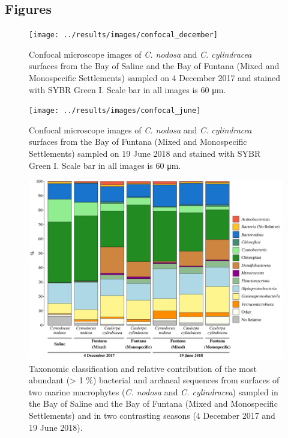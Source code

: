 \documentclass[12pt,]{article}
\begin{document}
\newpage

\hypertarget{figures}{%
\subsection{Figures}\label{figures}}

\begin{figure}[ht]

{\centering \texttt{[image: ../results/images/confocal\_december]} 

}

\caption{Confocal microscope images of \textit{C. nodosa} and \textit{C. cylindracea} surfaces from the Bay of Saline and the Bay of Funtana (Mixed and Monospecific Settlements) sampled on 4 December 2017 and stained with SYBR Green I. Scale bar in all images is 60 \si{\um}.\label{confocal_december}}\label{fig:unnamed-chunk-1}
\end{figure}

\newpage
\begin{figure}[ht]

{\centering \texttt{[image: ../results/images/confocal\_june]} 

}

\caption{Confocal microscope images of \textit{C. nodosa} and \textit{C. cylindracea} surfaces from the Bay of Funtana (Mixed and Monospecific Settlements) sampled on 19 June 2018 and stained with SYBR Green I. Scale bar in all images is 60 \si{\um}.\label{confocal_june}}\label{fig:unnamed-chunk-2}
\end{figure}

\newpage
\begin{figure}[ht]

{\centering \includegraphics[width=1\linewidth]{../results/figures/community_bar_plot} 

}

\caption{Taxonomic classification and relative contribution of the most abundant (> 1 \si{\percent}) bacterial and archaeal sequences from surfaces of two marine macrophytes (\textit{C. nodosa} and \textit{C. cylindracea}) sampled in the Bay of Saline and the Bay of Funtana (Mixed and Monospecific Settlements) and in two contrasting seasons (4 December 2017 and 19 June 2018).\label{community}}\label{fig:unnamed-chunk-3}
\end{figure}
\end{document}

